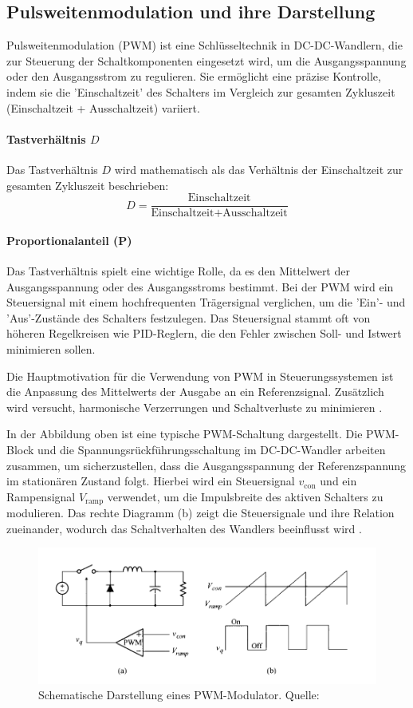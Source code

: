 

\subsection{Pulsweitenmodulation und ihre Darstellung}
Pulsweitenmodulation (PWM) ist eine Schlüsseltechnik in DC-DC-Wandlern, die zur Steuerung der Schaltkomponenten eingesetzt wird, um die Ausgangsspannung oder den Ausgangsstrom zu regulieren. Sie ermöglicht eine präzise Kontrolle, indem sie die 'Einschaltzeit' des Schalters im Vergleich zur gesamten Zykluszeit (Einschaltzeit + Ausschaltzeit) variiert.\cite[p.~2]{peddapelli2017pulse}

\paragraph{Tastverhältnis \(D\)}
Das Tastverhältnis \( D \) wird mathematisch als das Verhältnis der Einschaltzeit zur gesamten Zykluszeit beschrieben:
\begin{equation}
D = \frac{\text{Einschaltzeit}}{\text{Einschaltzeit} + \text{Ausschaltzeit}}
\end{equation}

\paragraph{Proportionalanteil (P)}
Das Tastverhältnis spielt eine wichtige Rolle, da es den Mittelwert der Ausgangsspannung oder des Ausgangsstroms bestimmt. Bei der PWM wird ein Steuersignal mit einem hochfrequenten Trägersignal verglichen, um die 'Ein'- und 'Aus'-Zustände des Schalters festzulegen. Das Steuersignal stammt oft von höheren Regelkreisen wie PID-Reglern, die den Fehler zwischen Soll- und Istwert minimieren sollen.

Die Hauptmotivation für die Verwendung von PWM in Steuerungssystemen ist die Anpassung des Mittelwerts der Ausgabe an ein Referenzsignal. Zusätzlich wird versucht, harmonische Verzerrungen und Schaltverluste zu minimieren \cite[p.~2]{peddapelli2017pulse}.

In der Abbildung oben ist eine typische PWM-Schaltung dargestellt. Die PWM-Block und die Spannungsrückführungsschaltung im DC-DC-Wandler arbeiten zusammen, um sicherzustellen, dass die Ausgangsspannung der Referenzspannung im stationären Zustand folgt. Hierbei wird ein Steuersignal \(v_{\text{con}}\) und ein Rampensignal \(V_{\text{ramp}}\) verwendet, um die Impulsbreite des aktiven Schalters zu modulieren. Das rechte Diagramm (b) zeigt die Steuersignale und ihre Relation zueinander, wodurch das Schaltverhalten des Wandlers beeinflusst wird \cite[p.~114]{choi2013pulsewidth}.



\begin{figure}[htbp]
    \centering
    \includegraphics[width=0.8\linewidth]{2Grundlagen/141PWM.png}
    \caption{Schematische Darstellung eines PWM-Modulator. Quelle: \cite[p.~114]{choi2013pulsewidth}}
    \label{fig:PWM_converter}
\end{figure}
